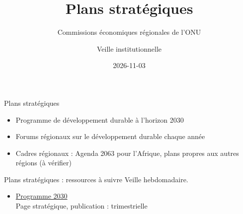 \documentclass[aspectratio=169,11pt]{beamer}
\title{Plans stratégiques}
\subtitle{Commissions économiques régionales de l'ONU}
\author{Veille institutionnelle}
\date{2026-11-03}
\begin{document}
\begin{frame}\titlepage\end{frame}

\begin{frame}{Plans stratégiques}
\begin{itemize}
\item Programme de développement durable à l'horizon 2030
\item Forums régionaux sur le développement durable chaque année
\item Cadres régionaux : Agenda 2063 pour l'Afrique, plans propres aux autres régions (à vérifier)
\end{itemize}
\end{frame}

\begin{frame}{Plans stratégiques : ressources à suivre}
\small
Veille hebdomadaire.
\begin{itemize}
\item \href{https://sdgs.un.org/2030agenda}{Programme 2030}\\{\footnotesize Page stratégique, publication : trimestrielle}
\end{itemize}
\end{frame}
\end{document}
